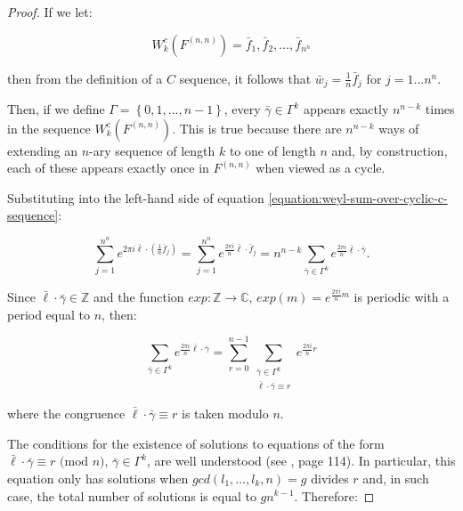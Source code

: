 \documentclass[11pt,a4paper]{tesis}
\theoremstyle{plain}
\theoremstyle{definition}
\begin{document}
\begin{proof}
  If we let:

  \begin{equation*}
    W_k^c\left(F^{(n, n)}\right) = \bar{f}_1, \bar{f}_2, \dots, \bar{f}_{n^n}
  \end{equation*}

  then from the definition of a $C$ sequence, it follows that $\bar{w}_j = \frac{1}{n} \bar{f}_j$ for $j = 1 \dots n^n$.
  
  Then, if we define $\Gamma = \left \{ 0, 1, \dots, n - 1 \right \} $, every $\bar{\gamma} \in \Gamma^k$ appears exactly $n^{n - k}$ times in the sequence $W_k^c\left(F^{(n, n)}\right)$. This is true because there are  $n^{n - k}$ ways of extending an $n$-ary sequence of length $k$ to one of length $n$ and, by construction, each of these appears exactly once in $F^{(n, n)}$ when viewed as a cycle.
  
  Substituting into the left-hand side of equation \ref{equation:weyl-sum-over-cyclic-c-sequence}:
  
  \begin{equation*}
    \sum_{j = 1}^{n^n} e^{2 \pi i \bar{\ell} \cdot (\frac{1}{n} \bar{f}_j)} = \sum_{j = 1}^{n^n} e^{\frac{2 \pi i}{n} \bar{\ell} \cdot \bar{f}_j} = n^{n - k} \sum_{\bar{\gamma} \in \Gamma^k} e^{\frac{2 \pi i}{n} \bar{\ell} \cdot \bar{\gamma}} \text{.}
  \end{equation*}

  Since $\bar{\ell} \cdot \bar{\gamma} \in \mathbb{Z}$ and the function $exp : \mathbb{Z} \to \mathbb{C}$, $exp(m) = e^{\frac{2 \pi i}{n} m}$ is periodic with a period equal to $n$, then:

  \begin{equation*}
    \sum_{\bar{\gamma} \in \Gamma^k} e^{\frac{2 \pi i}{n} \bar{\ell} \cdot \bar{\gamma}}
    = \sum_{r = 0}^{n - 1}
        \sum_{
          \substack{
            \bar{\gamma} \in \Gamma^k \\
            \bar{\ell} \cdot \bar{\gamma} \equiv r
          }
        } e^{\frac{2 \pi i}{n} r}
  \end{equation*}

  where the congruence $\bar{\ell} \cdot \bar{\gamma} \equiv r$ is taken modulo $n$.

  The conditions for the existence of solutions to equations of the form $\bar{\ell} \cdot \bar{\gamma} \equiv r \text{ (mod $n$)}$, $\bar{\gamma} \in \Gamma^k$, are well understood (see \cite{mccarthy-1986}, page 114). In particular, this equation only has solutions when $gcd(l_1, \dots, l_k, n) = g$ divides $r$ and, in such case, the total number of solutions is equal to $g n^{k - 1}$. Therefore:


\end{proof}
\end{document}
